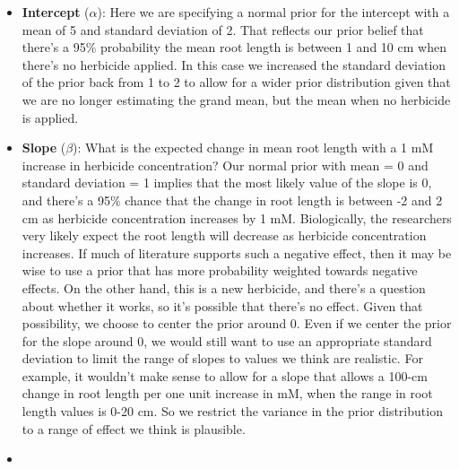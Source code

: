 \documentclass[
]{book}
\begin{document}
\begin{itemize}
  \begin{itemize}
  \item
    \textbf{Intercept} (\(\alpha\)): Here we are specifying a normal prior for the intercept with a mean of 5 and standard deviation of 2. That reflects our prior belief that there's a 95\% probability the mean root length is between 1 and 10 cm when there's no herbicide applied. In this case we increased the standard deviation of the prior back from 1 to 2 to allow for a wider prior distribution given that we are no longer estimating the grand mean, but the mean when no herbicide is applied.
  \item
    \textbf{Slope} (\(\beta\)): What is the expected change in mean root length with a 1 mM increase in herbicide concentration? Our normal prior with mean = 0 and standard deviation = 1 implies that the most likely value of the slope is 0, and there's a 95\% chance that the change in root length is between -2 and 2 cm as herbicide concentration increases by 1 mM. Biologically, the researchers very likely expect the root length will decrease as herbicide concentration increases. If much of literature supports such a negative effect, then it may be wise to use a prior that has more probability weighted towards negative effects. On the other hand, this is a new herbicide, and there's a question about whether it works, so it's possible that there's no effect. Given that possibility, we choose to center the prior around 0. Even if we center the prior for the slope around 0, we would still want to use an appropriate standard deviation to limit the range of slopes to values we think are realistic. For example, it wouldn't make sense to allow for a slope that allows a 100-cm change in root length per one unit increase in mM, when the range in root length values is 0-20 cm. So we restrict the variance in the prior distribution to a range of effect we think is plausible.
  \item

\end{itemize}
\end{itemize}
\end{document}
